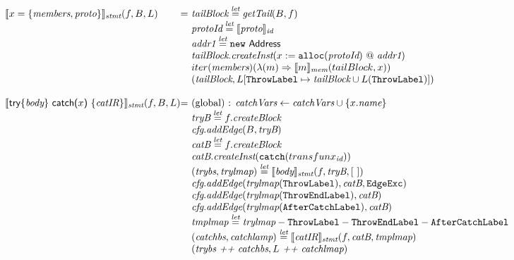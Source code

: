 \[\begin{array}{l@{}l@{~}l}
\transfun{\irobject{x}{\emph{members}, \emph{proto}}}_{\emph{stmt}}(f, B, L)
& = & \emph{tailBlock} \letval \getTail(B, f)\\
& & \emph{protoId} \letval \transfun{\emph{proto}}_{\emph{id}}\\
& & \emph{addr1} \letval \new\ \Address\\
& & \emph{tailBlock}.\emph{createInst}(x := \TT{alloc}(\emph{protoId}) ~@~ \emph{addr1})\\
& & iter(\emph{members})(\lambda(m) \Rightarrow \transfun{m}_{\emph{mem}}(tailBlock, x))\\
& & (\emph{tailBlock}, L[\ThrowLabel \mapsto \emph{tailBlock} \cup L(\ThrowLabel)])\\
& & \\

\transfun{\ircfgtrycat{\emph{body}}{x}{\emph{catIR}}}_{\emph{stmt}}(f, B, L)
& = & \text{(global) : } \emph{catchVars} \leftarrow \emph{catchVars} \cup \{ x.\emph{name} \}\\
& & \emph{tryB} \letval f.\emph{createBlock}\\
& & \emph{cfg}.\emph{addEdge}(B, \emph{tryB})\\
& & \emph{catB} \letval f.\emph{createBlock}\\
& & \emph{catB}.\emph{createInst}(\TT{catch}(transfun{x}_{\emph{id}}))\\
& & (\emph{trybs}, \emph{trylmap}) \letval \transfun{\emph{body}}_{\emph{stmt}}(f, \emph{tryB}, [\ ])\\
& & \emph{cfg}.\emph{addEdge}(\emph{trylmap}(\ThrowLabel), \emph{catB}, \EdgeExc)\\
& & \emph{cfg}.\emph{addEdge}(\emph{trylmap}(\ThrowEndLabel), \emph{catB})\\
& & \emph{cfg}.\emph{addEdge}(\emph{trylmap}(\AfterCatchLabel), \emph{catB})\\
& & \emph{tmplmap} \letval \emph{trylmap} - \ThrowLabel - \ThrowEndLabel - \AfterCatchLabel\\
& & (\emph{catchbs}, \emph{catchlamp}) \letval \transfun{\emph{catIR}}_{\emph{stmt}}(f, \emph{catB}, \emph{tmplmap})\\
& & (\emph{trybs} ~\emph{++}~ \emph{catchbs}, L ~\emph{++}~ \emph{catchlmap})\\
& & \\


\end{array}\]
